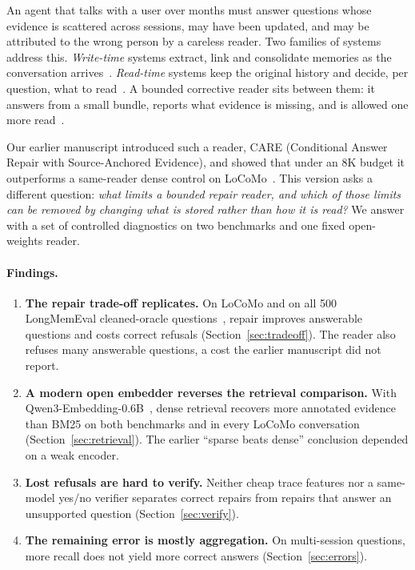 \documentclass[11pt]{article}
\newcommand{\care}{\textsc{CARE}}
\begin{document}
An agent that talks with a user over months must answer questions whose
evidence is scattered across sessions, may have been updated, and may be
attributed to the wrong person by a careless reader. Two families of systems
address this. \emph{Write-time} systems extract, link and consolidate memories
as the conversation arrives~\cite{packer2023memgpt,chhikara2025mem0,amem2025,memoryr12025,cao2026higmem}.
\emph{Read-time} systems keep the original history and decide, per question,
what to read~\cite{du2026memr3,wang2026cuemem,liu2026livectx,chen2026justmem,yu2026lazymem}.
A bounded corrective reader sits between them: it answers from a small bundle,
reports what evidence is missing, and is allowed one more read~\cite{jiang2023active,asai2023selfrag,yan2024crag}.

Our earlier manuscript introduced such a reader, \care{} (Conditional Answer
Repair with Source-Anchored Evidence), and showed that under an 8K budget it
outperforms a same-reader dense control on LoCoMo~\cite{maharana2024locomo}.
This version asks a different question: \emph{what limits a bounded repair
reader, and which of those limits can be removed by changing what is stored
rather than how it is read?} We answer with a set of controlled diagnostics on
two benchmarks and one fixed open-weights reader.

\paragraph{Findings.}
\begin{enumerate}
  \item \textbf{The repair trade-off replicates.} On LoCoMo and on all 500
  LongMemEval cleaned-oracle questions~\cite{wu2024longmemeval}, repair
  improves answerable questions and costs correct refusals
  (Section~\ref{sec:tradeoff}). The reader also refuses many answerable
  questions, a cost the earlier manuscript did not report.
  \item \textbf{A modern open embedder reverses the retrieval comparison.}
  With Qwen3-Embedding-0.6B~\cite{zhang2025qwen3embedding}, dense retrieval
  recovers more annotated evidence than BM25 on both benchmarks and in every
  LoCoMo conversation (Section~\ref{sec:retrieval}). The earlier
  ``sparse beats dense'' conclusion depended on a weak encoder.
  \item \textbf{Lost refusals are hard to verify.} Neither cheap trace features
  nor a same-model yes/no verifier separates correct repairs from repairs that
  answer an unsupported question (Section~\ref{sec:verify}).
  \item \textbf{The remaining error is mostly aggregation.} On multi-session
  questions, more recall does not yield more correct answers
  (Section~\ref{sec:errors}).
\end{enumerate}
\end{document}
